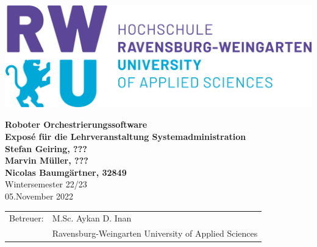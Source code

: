 \pagestyle{empty}



\begin{center}


\vspace*{2cm}
\includegraphics[scale=0.15]{imgs/rwu_logo.png}
\vspace*{3cm}

\huge
\textbf{Roboter Orchestrierungssoftware}\\
\Large
\vspace*{2cm}
\noindent \textbf{Expos\'e für die Lehrveranstaltung Systemadministration}\\
\vspace*{0.5cm}
\noindent \textbf{Stefan Geiring, ???}\\
\noindent \textbf{Marvin Müller, ???}\\
\noindent \textbf{Nicolas Baumgärtner, 32849}\\
\vspace*{0.5cm}
Wintersemester 22/23\\
\normalsize 
05.November 2022
\vspace*{2cm}
\end{center}


\vspace*{4.5cm}
\begin{tabular}{ll}
Betreuer: & M.Sc. Aykan D. Inan \\
 & Ravensburg-Weingarten University of Applied Sciences\\
\end{tabular}

